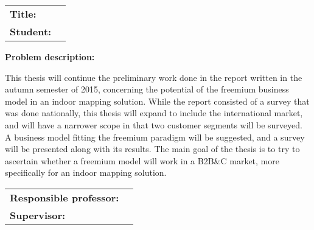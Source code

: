 \begin{titlingpage}

\noindent
\begin{tabular}{@{}p{2cm}l}
\textbf{Title:} 	& \thetitle \\
\textbf{Student:}	& \theauthor \\
\end{tabular}

\vspace{4ex}
\noindent\textbf{Problem description:}
\vspace{2ex}

\noindent This thesis will continue the preliminary work done in the report written in the autumn semester of 2015, concerning the potential of the freemium business model in an indoor mapping solution. While the report consisted of a survey that was done nationally, this thesis will expand to include the international market, and will have a narrower scope in that two customer segments will be surveyed. A business model fitting the freemium paradigm will be suggested, and a survey will be presented along with its results. The main goal of the thesis is to try to ascertain whether a freemium model will work in a B2B\&C market, more specifically for an indoor mapping solution.
\vspace{6ex}

\noindent
\begin{tabular}{@{}p{4cm}l}
\textbf{Responsible professor:} 	& \theprofessor \\
\textbf{Supervisor:}			& \thesupervisor \\
\end{tabular}

\end{titlingpage}
